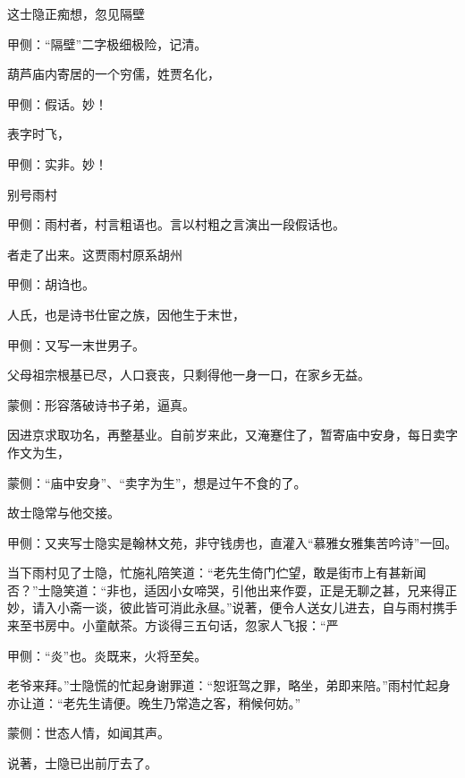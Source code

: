 \begin{parag}
    这士隐正痴想，忽见隔壁\begin{note}甲侧：“隔壁”二字极细极险，记清。\end{note}葫芦庙内寄居的一个穷儒，姓贾名化，\begin{note}甲侧：假话。妙！\end{note}表字时飞，\begin{note}甲侧：实非。妙！\end{note}别号雨村\begin{note}甲侧：雨村者，村言粗语也。言以村粗之言演出一段假话也。\end{note}者走了出来。这贾雨村原系胡州\begin{note}甲侧：胡诌也。\end{note}人氏，也是诗书仕宦之族，因他生于末世，\begin{note}甲侧：又写一末世男子。\end{note}父母祖宗根基已尽，人口衰丧，只剩得他一身一口，在家乡无益。\begin{note}蒙侧：形容落破诗书子弟，逼真。\end{note}因进京求取功名，再整基业。自前岁来此，又淹蹇住了，暂寄庙中安身，每日卖字作文为生，\begin{note}蒙侧：“庙中安身”、“卖字为生”，想是过午不食的了。\end{note}故士隐常与他交接。\begin{note}甲侧：又夹写士隐实是翰林文苑，非守钱虏也，直灌入“慕雅女雅集苦吟诗”一回。\end{note}当下雨村见了士隐，忙施礼陪笑道：“老先生倚门伫望，敢是街市上有甚新闻否？”士隐笑道：“非也，适因小女啼哭，引他出来作耍，正是无聊之甚，兄来得正妙，请入小斋一谈，彼此皆可消此永昼。”说著，便令人送女儿进去，自与雨村携手来至书房中。小童献茶。方谈得三五句话，忽家人飞报：“严\begin{note}甲侧：“炎”也。炎既来，火将至矣。\end{note}老爷来拜。”士隐慌的忙起身谢罪道：“恕诳驾之罪，略坐，弟即来陪。”雨村忙起身亦让道：“老先生请便。晚生乃常造之客，稍候何妨。”\begin{note}蒙侧：世态人情，如闻其声。\end{note}说著，士隐已出前厅去了。
\end{parag}


